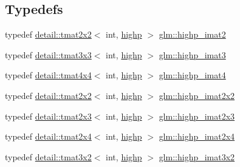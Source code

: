 \subsection*{Typedefs}
\begin{DoxyCompactItemize}
\item 
typedef \hyperlink{structglm_1_1detail_1_1tmat2x2}{detail\+::tmat2x2}$<$ int, \hyperlink{namespaceglm_a0f04f086094c747d227af4425893f545ac6f7eab42eacbb10d59a58e95e362074}{highp} $>$ \hyperlink{group__gtc__matrix__integer_ga70eae282157f23589db24f4664bbf956}{glm\+::highp\+\_\+imat2}
\item 
typedef \hyperlink{structglm_1_1detail_1_1tmat3x3}{detail\+::tmat3x3}$<$ int, \hyperlink{namespaceglm_a0f04f086094c747d227af4425893f545ac6f7eab42eacbb10d59a58e95e362074}{highp} $>$ \hyperlink{group__gtc__matrix__integer_gaf12b3aa7e16a88b1fcf51be9a132048c}{glm\+::highp\+\_\+imat3}
\item 
typedef \hyperlink{structglm_1_1detail_1_1tmat4x4}{detail\+::tmat4x4}$<$ int, \hyperlink{namespaceglm_a0f04f086094c747d227af4425893f545ac6f7eab42eacbb10d59a58e95e362074}{highp} $>$ \hyperlink{group__gtc__matrix__integer_ga9ca2f5624891bd1ac993fcde4dd24ac1}{glm\+::highp\+\_\+imat4}
\item 
typedef \hyperlink{structglm_1_1detail_1_1tmat2x2}{detail\+::tmat2x2}$<$ int, \hyperlink{namespaceglm_a0f04f086094c747d227af4425893f545ac6f7eab42eacbb10d59a58e95e362074}{highp} $>$ \hyperlink{group__gtc__matrix__integer_ga9646ff5ef973234755e63e727c5a37fc}{glm\+::highp\+\_\+imat2x2}
\item 
typedef \hyperlink{structglm_1_1detail_1_1tmat2x3}{detail\+::tmat2x3}$<$ int, \hyperlink{namespaceglm_a0f04f086094c747d227af4425893f545ac6f7eab42eacbb10d59a58e95e362074}{highp} $>$ \hyperlink{group__gtc__matrix__integer_ga7b7079ab95ac8f533ac565fcf1341c76}{glm\+::highp\+\_\+imat2x3}
\item 
typedef \hyperlink{structglm_1_1detail_1_1tmat2x4}{detail\+::tmat2x4}$<$ int, \hyperlink{namespaceglm_a0f04f086094c747d227af4425893f545ac6f7eab42eacbb10d59a58e95e362074}{highp} $>$ \hyperlink{group__gtc__matrix__integer_ga84aec2e744ecac589fe8d502266e8efc}{glm\+::highp\+\_\+imat2x4}
\item 
typedef \hyperlink{structglm_1_1detail_1_1tmat3x2}{detail\+::tmat3x2}$<$ int, \hyperlink{namespaceglm_a0f04f086094c747d227af4425893f545ac6f7eab42eacbb10d59a58e95e362074}{highp} $>$ \hyperlink{group__gtc__matrix__integer_ga9780c1bc052a34c59dc95f4dd9e1a5c8}{glm\+::highp\+\_\+imat3x2}
\item 

\end{DoxyCompactItemize}
